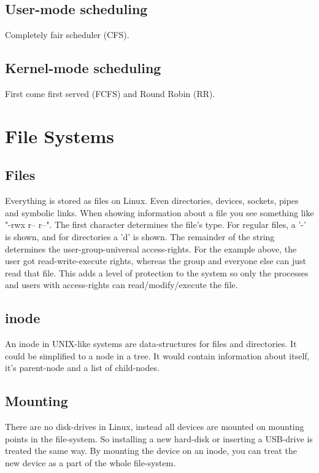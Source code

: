\documentclass[12pt]{article}
\begin{document}
\subsection{User-mode scheduling}
Completely fair scheduler (CFS).

\subsection{Kernel-mode scheduling}
First come first served  (FCFS) and Round Robin (RR).


\section{File Systems} %
\subsection{Files}
Everything is stored as files on Linux. Even directories, devices, sockets, pipes and symbolic links.
When showing information about a file you see something like "-rwx r-- r--". 
The first character determines the file's type. For regular files, a '-' is shown, and for directories a 'd' is shown. 
The remainder of the string determines the user-group-universal access-rights. 
For the example above, the user got read-write-execute rights, whereas the group and everyone else can just read that file.
This adds a level of protection to the system so only the processes and users with access-rights can read/modify/execute the file.

\subsection{inode}
An inode in UNIX-like systems are data-structures for files and directories. 
It could be simplified to a node in a tree. It would contain information about itself, it's parent-node and a list of child-nodes.

\subsection{Mounting}
There are no disk-drives in Linux, instead all devices are mounted on mounting points in the file-system. 
So installing a new hard-disk or inserting a USB-drive is treated the same way.
By mounting the device on an inode, you can treat the new device as a part of the whole file-system.
\end{document}
